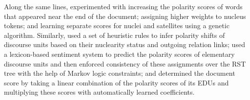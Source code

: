 Along the same lines,  experimented with increasing the polarity scores of words that appeared near the
  end of the document; assigning higher weights to nucleus tokens; and  learning separate scores for nuclei and satellites using a genetic algorithm.
Similarly,  used a set of heuristic rules to infer
polarity shifts of discourse units based on their nuclearity status
and outgoing relation links;  used a lexicon-based
sentiment system to predict the polarity scores of elementary
discourse units and then enforced consistency of these assignments
over the RST tree with the help of Markov logic constraints; and
 determined the
document score by taking a linear combination of the polarity scores of its
EDUs and multiplying these scores with automatically learned
coefficients.


